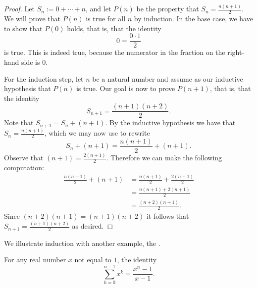 \begin{proof}
  Let $S_n:=0+\cdots+n$, and let $P(n)$ be the property that $S_n=\frac{n(n+1)}{2}$. We will prove that $P(n)$ is true for all $n$ by induction. In the base case, we have to show that $P(0)$ holds, that is, that the identity
  \begin{equation*}
    0=\frac{0\cdot 1}{2}
  \end{equation*}
  is true. This is indeed true, because the numerator in the fraction on the right-hand side is $0$.

  For the induction step, let $n$ be a natural number and assume as our inductive hypothesis that $P(n)$ is true. Our goal is now to prove $P(n+1)$, that is, that the identity
  \begin{equation*}
    S_{n+1}=\frac{(n+1)(n+2)}{2}.
  \end{equation*}
  Note that $S_{n+1}=S_n+(n+1)$. By the inductive hypothesis we have that $S_n=\frac{n(n+1)}{2}$, which we may now use to rewrite
  \begin{equation*}
    S_n + (n+1) = \frac{n(n+1)}{2} + (n+1).
  \end{equation*}
  Observe that $(n+1)=\frac{2(n+1)}{2}$. Therefore we can make the following computation:
  \begin{align*}
    \frac{n(n+1)}{2} + (n+1) 
    & = \frac{n(n+1)}{2}+\frac{2(n+1)}{2} \\
    & = \frac{n(n+1)+2(n+1)}{2} \\
    & = \frac{(n+2)(n+1)}{2}.
  \end{align*}
  Since $(n+2)(n+1)=(n+1)(n+2)$ it follows that $S_{n+1}=\frac{(n+1)(n+2)}{2}$ as desired.
\end{proof}

We illustrate induction with another example, the .

\begin{theorem}\label{theorem:formula-geometric-series}
  For any real number $x$ not equal to $1$, the identity
  \begin{equation*}
    \sum_{k=0}^{n-1}x^k = \frac{x^n-1}{x-1}.
  \end{equation*}
\end{theorem}

